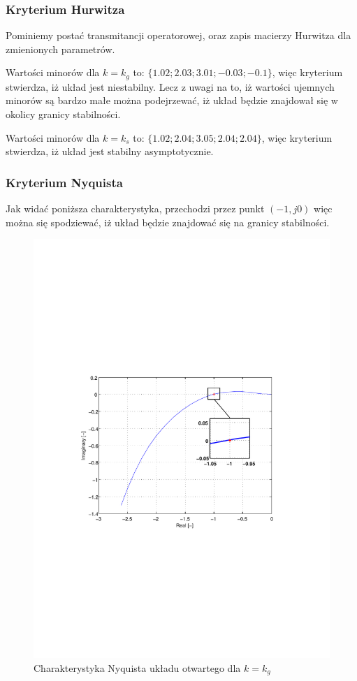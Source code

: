 \documentclass[12pt]{article}
\begin{document}
\subsubsection{Kryterium Hurwitza}

Pominiemy postać transmitancji operatorowej, oraz zapis macierzy Hurwitza dla
zmienionych parametrów.

Wartości minorów dla $k=k_g$ to: $\{1.02;2.03;3.01;-0.03;-0.1\}$, więc kryterium
stwierdza, iż układ jest niestabilny. Lecz z uwagi na to, iż wartości ujemnych
minorów są bardzo małe można podejrzewać, iż układ będzie znajdował się w
okolicy granicy stabilności.

Wartości minorów dla $k=k_s$ to: $\{1.02;2.04;3.05;2.04;2.04\}$,
więc kryterium stwierdza, iż układ jest stabilny asymptotycznie.

\subsubsection{Kryterium Nyquista}

Jak widać poniższa charakterystyka, przechodzi przez punkt $(-1, j0)$ więc można
się spodziewać, iż układ będzie znajdować się na granicy stabilności.

\begin{figure}[!htb]
	\begin{center}
		\includegraphics[trim=5cm 9cm 5cm 9cm]{../res/img/0,3-1-0,5_nyq.pdf} 
	\end{center}
	\caption{Charakterystyka Nyquista układu otwartego dla $k=k_g$}
\end{figure}
\end{document}
